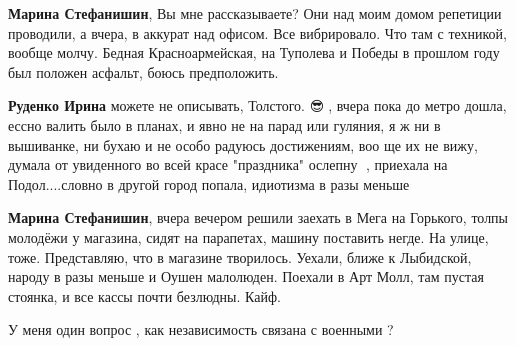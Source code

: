 \begin{itemize}
\begin{itemize}
 
\textbf{Марина Стефанишин}, Вы мне рассказываете? Они над моим домом репетиции проводили, а вчера, в аккурат над офисом. Все вибрировало. Что там с техникой, вообще молчу. Бедная Красноармейская, на Туполева и Победы в прошлом году был положен асфальт, боюсь предположить.

 
\textbf{Руденко Ирина} можете не описывать, Толстого. 😎🤕, вчера пока до метро дошла, ессно валить было в планах, и явно не на парад или гуляния, я ж ни в вышиванке, ни бухаю и не особо радуюсь достижениям, воо ще их не вижу, думала от увиденного во всей красе "праздника" ослепну 🤯, приехала на Подол....словно в другой город попала, идиотизма в разы меньше

 
\textbf{Марина Стефанишин}, вчера вечером решили заехать в Мега на Горького,
толпы молодёжи у магазина, сидят на парапетах, машину поставить негде. На
улице, тоже. Представляю, что в магазине творилось. Уехали, ближе к Лыбидской,
народу в разы меньше и Оушен малолюден. Поехали в Арт Молл, там пустая стоянка,
и все кассы почти безлюдны. Кайф.

\end{itemize}

 
У меня один вопрос , как независимость связана с военными ?

\begin{itemize}
 

\end{itemize}
\end{itemize}
